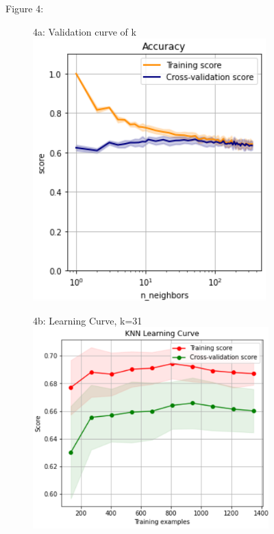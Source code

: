 \documentclass{article}
\begin{document}
\begin{figure}
	\centering
	Figure 4:\\
	\begin{subfigure}{.26\textwidth}
		\centering
		4a: Validation curve of k
		\includegraphics[width=\linewidth]{poland_knn_n_neighbors_350_accuracy.png}
		
	\end{subfigure}
	\begin{subfigure}{.34\textwidth}
		\centering
		4b: Learning Curve, k=31
		\includegraphics[width=\linewidth]{poland_knn_learning_curve.png}
	

\end{subfigure}
\end{figure}
\end{document}
